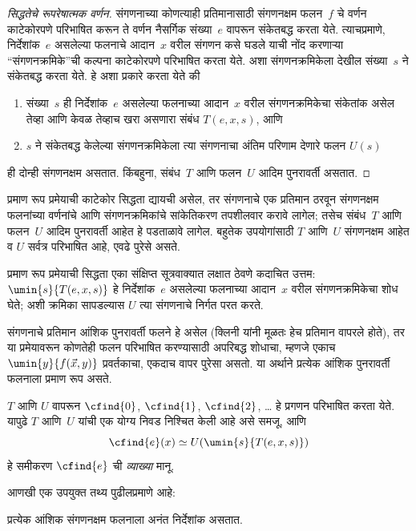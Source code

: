 \begin{proof}[सिद्धतेचे रूपरेषात्मक वर्णन]
संगणनाच्या कोणत्याही प्रतिमानासाठी संगणनक्षम फलन~$f$ चे वर्णन
काटेकोरपणे परिभाषित करून ते वर्णन नैसर्गिक संख्या~$e$ वापरून
संकेतबद्ध करता येते. त्याचप्रमाणे, निर्देशांक~$e$ असलेल्या फलनाचे
आदान~$x$ वरील संगणन कसे घडले याची नोंद करणाऱ्या ``संगणनक्रमिके''ची
कल्पना काटेकोरपणे परिभाषित करता येते. अशा संगणनक्रमिकेला देखील
संख्या~$s$ ने संकेतबद्ध करता येते. हे अशा प्रकारे करता येते की
\begin{enumerate}
  \item संख्या~$s$ ही निर्देशांक~$e$ असलेल्या फलनाच्या आदान~$x$
  वरील संगणनक्रमिकेचा संकेतांक असेल तेव्हा आणि केवळ तेव्हाच खरा असणारा संबंध
  $T(e, x, s)$, आणि
  \item $s$ ने संकेतबद्ध केलेल्या संगणनक्रमिकेला त्या संगणनाचा अंतिम
  परिणाम देणारे फलन $U(s)$
\end{enumerate}
ही दोन्ही संगणनक्षम असतात. किंबहुना, संबंध~$T$ आणि फलन~$U$
आदिम पुनरावर्ती असतात.
\end{proof}

\begin{explain}
प्रमाण रूप प्रमेयाची काटेकोर सिद्धता द्यायची असेल, तर संगणनाचे एक
प्रतिमान ठरवून संगणनक्षम फलनांच्या वर्णनांचे आणि संगणनक्रमिकांचे
सांकेतिकरण तपशीलवार करावे लागेल; तसेच संबंध~$T$ आणि फलन~$U$
आदिम पुनरावर्ती आहेत हे पडताळावे लागेल. बहुतेक उपयोगांसाठी $T$
आणि~$U$ संगणनक्षम आहेत व $U$ सर्वत्र परिभाषित आहे, एवढे पुरेसे असते.

प्रमाण रूप प्रमेयाची सिद्धता एका संक्षिप्त सूत्रवाक्यात लक्षात ठेवणे
कदाचित उत्तम: $\umin{s}{T(e, x, s)}$ हे निर्देशांक~$e$ असलेल्या
फलनाच्या आदान~$x$ वरील संगणनक्रमिकेचा शोध घेते; अशी क्रमिका
सापडल्यास $U$ त्या संगणनाचे निर्गत परत करते.
\end{explain}

संगणनाचे प्रतिमान आंशिक पुनरावर्ती फलने हे असेल (क्लिनी यांनी
मूळतः हेच प्रतिमान वापरले होते), तर या प्रमेयावरून कोणतेही फलन
परिभाषित करण्यासाठी अपरिबद्ध शोधाचा, म्हणजे एकाच
$\umin{y}{f(\vec x, y)}$ प्रवर्तकाचा, एकदाच वापर पुरेसा असतो.
या अर्थाने प्रत्येक आंशिक पुनरावर्ती फलनाला प्रमाण रूप असते.

$T$ आणि $U$ वापरून $\cfind{0}$, $\cfind{1}$, $\cfind{2}$, \dots
हे प्रगणन परिभाषित करता येते. यापुढे $T$ आणि~$U$ यांची एक योग्य
निवड निश्चित केली आहे असे समजू, आणि
\[\cfind{e}(x) \simeq U(\umin{s}{T(e,x,s)})
\]
हे समीकरण $\cfind{e}$ ची \emph{व्याख्या} मानू.

आणखी एक उपयुक्त तथ्य पुढीलप्रमाणे आहे:

\begin{thm}
प्रत्येक आंशिक संगणनक्षम फलनाला अनंत निर्देशांक असतात.
\end{thm}


